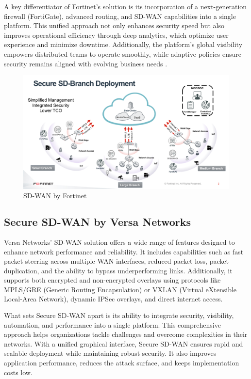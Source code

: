 \documentclass[12pt,english]{report}
\begin{document}
A key differentiator of Fortinet’s solution is its incorporation of a next-generation firewall (FortiGate), advanced routing, and SD-WAN capabilities into a single platform. This unified approach not only enhances security speed but also improves operational efficiency through deep analytics, which optimize user experience and minimize downtime. Additionally, the platform’s global visibility empowers distributed teams to operate smoothly, while adaptive policies ensure security remains aligned with evolving business needs \cite{ref8}.
\begin{figure}[H]
    \centering
    \includegraphics[width= 1\textwidth]{chapter1/sdwan fortinet.png}
    \caption{ SD-WAN by Fortinet\cite{ref9}}
    \label{fig:  SD-WAN by Fortinet}
\end{figure}
\subsection{Secure SD-WAN by Versa Networks}
Versa Networks’ SD-WAN solution offers a wide range of features designed to enhance network performance and reliability. It includes capabilities such as fast packet steering across multiple WAN interfaces, reduced packet loss, packet duplication, and the ability to bypass underperforming links. Additionally, it supports both encrypted and non-encrypted overlays using protocols like MPLS/GRE (Generic Routing Encapsulation) or VXLAN (Virtual eXtensible Local-Area Network), dynamic IPSec overlays, and direct internet access.

What sets Secure SD-WAN apart is its ability to integrate security, visibility, automation, and performance into a single platform. This comprehensive approach helps organizations tackle challenges and overcome complexities in their networks. With a unified graphical interface, Secure SD-WAN ensures rapid and scalable deployment while maintaining robust security. It also improves application performance, reduces the attack surface, and keeps implementation costs low.
\end{document}
